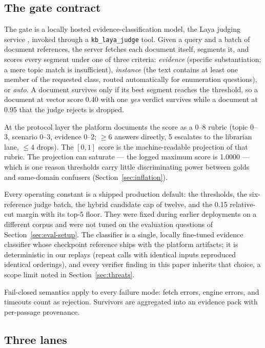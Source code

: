 \subsection{The gate contract}
\label{sec:gate}

The gate is a locally hosted evidence-classification model, the Laya judging
service \cite{laya}, invoked through a \texttt{kb\_laya\_judge} tool. Given a
query and a batch of document references, the server fetches each document
itself, segments it, and scores every segment under one of three criteria:
\emph{evidence} (specific substantiation; a mere topic match is insufficient),
\emph{instance} (the text contains at least one member of the requested class,
routed automatically for enumeration questions), or \emph{auto}. A document
survives only if its best segment reaches the threshold, so a document at vector
score 0.40 with one \emph{yes} verdict survives while a document at 0.95 that the
judge rejects is dropped.

At the protocol layer the platform documents the score as a 0--8 rubric
(topic 0--3, scenario 0--3, evidence 0--2; $\geq$6 answers directly, 5 escalates to
the librarian lane, $\leq$4 drops). The $[0,1]$ score is the machine-readable
projection of that rubric. The projection can saturate --- the logged maximum
score is 1.0000 --- which is one reason thresholds carry little discriminating
power between golds and same-domain confusers (Section~\ref{sec:inflation}).

Every operating constant is a shipped production default: the thresholds, the
six-reference judge batch, the hybrid candidate cap of twelve, and the 0.15
relative-cut margin with its top-5 floor. They were fixed during earlier
deployments on a different corpus and were not tuned on the evaluation questions
of Section~\ref{sec:eval-setup}. The classifier is a single, locally fine-tuned
evidence classifier whose checkpoint reference ships with the platform
artifacts; it is deterministic in our replays (repeat calls with identical
inputs reproduced identical orderings), and every verifier finding in this paper
inherits that choice, a scope limit noted in Section~\ref{sec:threats}.

Fail-closed semantics apply to every failure mode: fetch errors, engine errors,
and timeouts count as rejection. Survivors are aggregated into an evidence pack
with per-passage provenance.

\subsection{Three lanes}

